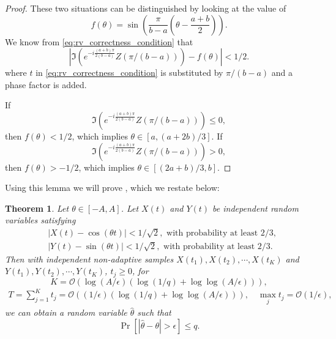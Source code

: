 \documentclass[twocolumn,superscriptaddress,aps,showpacs,amsmath,amstex,amssymb,citeautoscript,floatfix,pra,preprintnumbers]{revtex4-2}
\newtheorem*{theorem*}{Theorem}
\theoremstyle{plain}
\theoremstyle{plain}
\theoremstyle{plain}
\theoremstyle{plain}
\theoremstyle{plain}
\theoremstyle{plain}
\begin{document}
\begin{appendix}
\begin{proof}
    These two situations can be distinguished by looking at the value of 
    \[
    f(\theta)=\sin\left(\frac{\pi}{b-a}\left(\theta-\frac{a+b}{2}\right)\right).
    \]
    We know from \eqref{eq:rv_correctness_condition} that
    \[
    \left|\Im\left(e^{-i\frac{(a+b)\pi}{2(b-a)}}Z(\pi/(b-a))\right)-f(\theta)\right|<1/2.
    \]
    where $t$ in \eqref{eq:rv_correctness_condition} is substituted by $\pi/(b-a)$ and a phase factor is added.
    
    If $$\Im\left(e^{-i\frac{(a+b)\pi}{2(b-a)}}Z(\pi/(b-a))\right)\leq 0,$$ then $f(\theta)<1/2$, which implies $\theta\in[a,(a+2b)/3]$. If $$\Im\left(e^{-i\frac{(a+b)\pi}{2(b-a)}}Z(\pi/(b-a))\right)> 0,$$ then $f(\theta)>-1/2$, which implies $\theta\in[(2a+b)/3,b]$.
\end{proof}

Using this lemma we will prove , which we restate below:

\begin{theorem*}
    Let $\theta\in[-A,A]$.
    Let $X(t)$ and $Y(t)$ be independent random variables satisfying
    \begin{equation}
        \label{eq:rv_correctness_condition_prob}
        \begin{aligned}
            &|X(t)-\cos(\theta t)|< 1/\sqrt{2}, \text{ with probability at least }2/3, \\
            &|Y(t)-\sin(\theta t)|< 1/\sqrt{2}, \text{ with probability at least }2/3.
        \end{aligned}
    \end{equation}
    Then with independent non-adaptive samples $X(t_1),X(t_2),\cdots,X(t_K)$ and $Y(t_1),Y(t_2),\cdots,Y(t_K)$, $t_j\geq 0$, for
    \begin{equation}
        \label{eq:number_of_samples_RPE}
        K=\mathcal{O}(\log(A/\epsilon)(\log(1/q)+\log\log(A/\epsilon))),
    \end{equation}
    \begin{equation}
    \label{eq:total_evolution_time_RPE}
    \begin{aligned}
        T=\sum_{j=1}^Kt_j=\mathcal{O}((1/\epsilon)(\log(1/q)+\log\log(A/\epsilon))),\quad \max_j t_j=\mathcal{O}(1/\epsilon),
    \end{aligned}
    \end{equation}
    we can obtain a random variable $\hat{\theta}$ such that
    \begin{equation}
        \Pr[|\hat{\theta}-\theta|>\epsilon]\leq q.
    \end{equation}
\end{theorem*}


\end{appendix}
\end{document}
